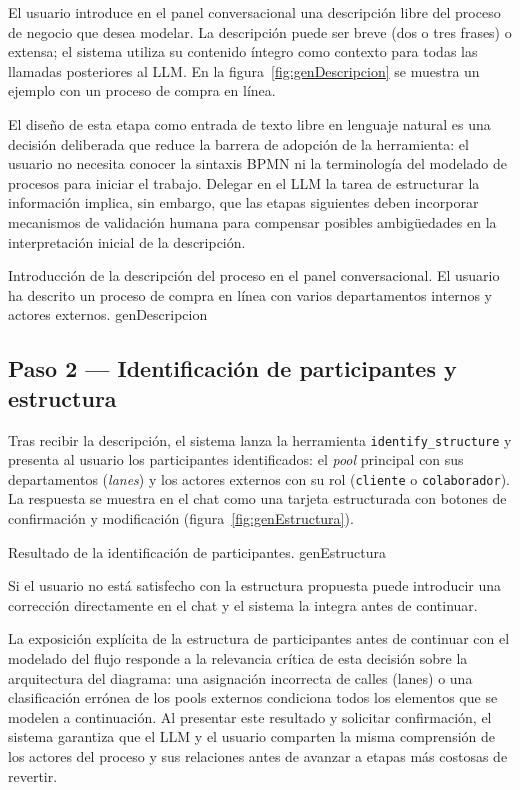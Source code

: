 El usuario introduce en el panel conversacional una descripción libre del proceso de negocio que desea modelar. La descripción puede ser breve (dos o tres frases) o extensa; el sistema utiliza su contenido íntegro como contexto para todas las llamadas posteriores al LLM. En la figura~\ref{fig:genDescripcion} se muestra un ejemplo con un proceso de compra en línea.

El diseño de esta etapa como entrada de texto libre en lenguaje natural es una decisión deliberada que reduce la barrera de adopción de la herramienta: el usuario no necesita conocer la sintaxis BPMN ni la terminología del modelado de procesos para iniciar el trabajo. Delegar en el LLM la tarea de estructurar la información implica, sin embargo, que las etapas siguientes deben incorporar mecanismos de validación humana para compensar posibles ambigüedades en la interpretación inicial de la descripción. 

%
  {Introducción de la descripción del proceso en el panel conversacional. El usuario ha descrito un proceso de compra en línea con varios departamentos internos y actores externos.}%
  {genDescripcion}

\subsection{Paso 2 --- Identificación de participantes y estructura}
\label{subsec:demoEstructura}

Tras recibir la descripción, el sistema lanza la herramienta \texttt{identify\_structure} y presenta al usuario los participantes identificados: el \textit{pool} principal con sus departamentos (\textit{lanes}) y los actores externos con su rol (\texttt{cliente} o \texttt{colaborador}). La respuesta se muestra en el chat como una tarjeta estructurada con botones de confirmación y modificación (figura~\ref{fig:genEstructura}).

%
  {Resultado de la identificación de participantes.}%
  {genEstructura}

Si el usuario no está satisfecho con la estructura propuesta puede introducir una corrección directamente en el chat y el sistema la integra antes de continuar.

La exposición explícita de la estructura de participantes antes de continuar con el modelado del flujo responde a la relevancia crítica de esta decisión sobre la arquitectura del diagrama: una asignación incorrecta de calles (lanes) o una clasificación errónea de los pools externos condiciona todos los elementos que se modelen a continuación. Al presentar este resultado y solicitar confirmación, el sistema garantiza que el LLM y el usuario comparten la misma comprensión de los actores del proceso y sus relaciones antes de avanzar a etapas más costosas de revertir.

